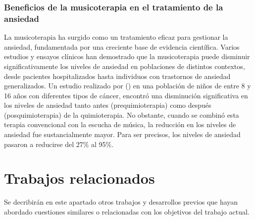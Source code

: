\subsubsection{Beneficios de la musicoterapia en el tratamiento de la ansiedad}

La musicoterapia ha surgido como un tratamiento eficaz para gestionar la ansiedad, fundamentada por una creciente base de evidencia científica. Varios estudios y ensayos clínicos han demostrado que la musicoterapia puede disminuir significativamente los niveles de ansiedad en poblaciones de distintos contextos, desde pacientes hospitalizados hasta individuos con trastornos de ansiedad generalizados. Un estudio realizado por \citeauthor{SEPULVEDA:2014} (\citeyear{SEPULVEDA:2014}) en una población de niños de entre 8 y 16 años con diferentes tipos de cáncer, encontró una disminución significativa en los niveles de ansiedad tanto antes (prequimioterapia) como después (posquimioterapia) de la quimioterapia. No obstante, cuando se combinó esta terapia convencional con la escucha de música, la reducción en los niveles de ansiedad fue sustancialmente mayor. Para ser precisos, los niveles de ansiedad pasaron a reducirse del 27\% al 95\%.

\section{Trabajos relacionados}

Se decribirán en este apartado otros trabajos y desarrollos previos que hayan abordado cuestiones similares o relacionadas con los objetivos del trabajo actual.

